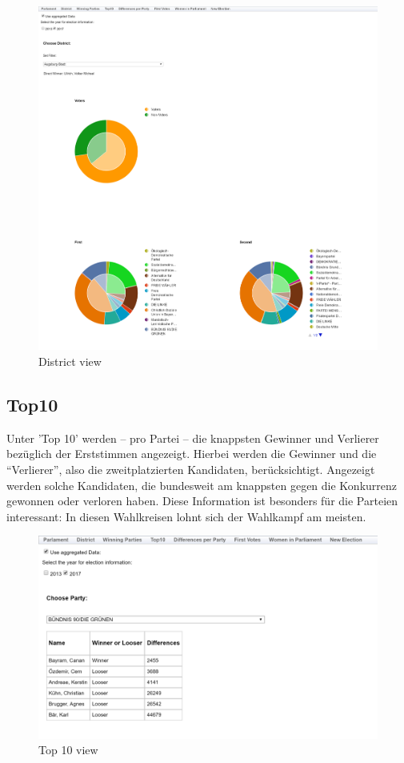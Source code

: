 \documentclass[a4paper]{scrreprt}
\begin{document}
\begin{figure}[H]
\centering
\includegraphics[width=\textwidth]{images/district.png}
\caption {District view}
\end{figure}

\subsection{Top10}

Unter 'Top 10' werden -- pro Partei -- die knappsten Gewinner und Verlierer bezüglich der Erststimmen angezeigt.
Hierbei werden die Gewinner und die "`Verlierer"', also die zweitplatzierten Kandidaten, berücksichtigt.
Angezeigt werden solche Kandidaten, die bundesweit am knappsten gegen die Konkurrenz gewonnen oder verloren haben.
Diese Information ist besonders für die Parteien interessant: In diesen Wahlkreisen lohnt sich der Wahlkampf am meisten.

\begin{figure}[H]
\centering
\includegraphics[width=\textwidth]{images/top10.png}
\caption {Top 10 view}
\end{figure}
\end{document}
